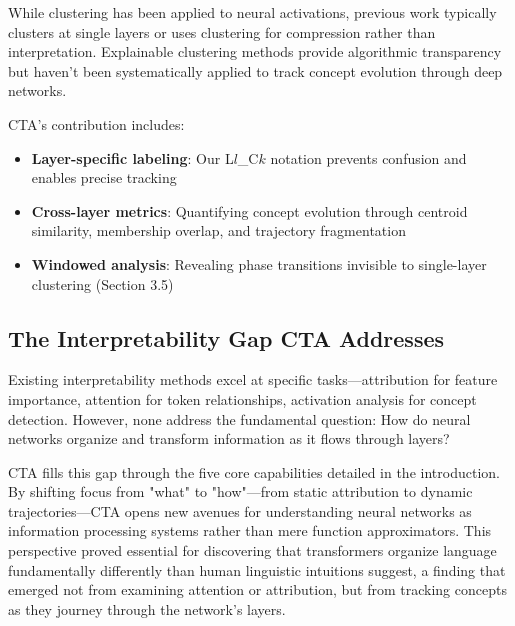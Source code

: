 While clustering has been applied to neural activations, previous work typically clusters at single layers or uses clustering for compression rather than interpretation. Explainable clustering methods \citep{dasgupta2020} provide algorithmic transparency but haven't been systematically applied to track concept evolution through deep networks.

CTA's contribution includes:
\begin{itemize}
    \item \textbf{Layer-specific labeling}: Our L$l$\_C$k$ notation prevents confusion and enables precise tracking
    \item \textbf{Cross-layer metrics}: Quantifying concept evolution through centroid similarity, membership overlap, and trajectory fragmentation
    \item \textbf{Windowed analysis}: Revealing phase transitions invisible to single-layer clustering (Section 3.5)
\end{itemize}

\subsection{The Interpretability Gap CTA Addresses}

Existing interpretability methods excel at specific tasks—attribution for feature importance, attention for token relationships, activation analysis for concept detection. However, none address the fundamental question: How do neural networks organize and transform information as it flows through layers?

CTA fills this gap through the five core capabilities detailed in the introduction. By shifting focus from "what" to "how"—from static attribution to dynamic trajectories—CTA opens new avenues for understanding neural networks as information processing systems rather than mere function approximators. This perspective proved essential for discovering that transformers organize language fundamentally differently than human linguistic intuitions suggest, a finding that emerged not from examining attention or attribution, but from tracking concepts as they journey through the network's layers.